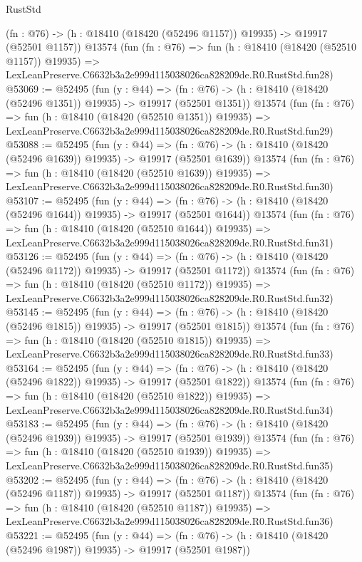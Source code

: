 \begin{lexlean}{RustStd}
\begin{coremodule}
    (fn : @76) -> (h : @18410 (@18420 (@52496 @1157)) @19935) -> @19917 (@52501 @1157))
    @13574
    (fun (fn : @76) =>
    fun (h : @18410 (@18420 (@52510 @1157)) @19935) =>
    LexLeanPreserve.C6632b3a2e999d115038026ca828209de.R0.RustStd.fun28)
@53069 := @52495
    (fun (y : @44) =>
    (fn : @76) -> (h : @18410 (@18420 (@52496 @1351)) @19935) -> @19917 (@52501 @1351))
    @13574
    (fun (fn : @76) =>
    fun (h : @18410 (@18420 (@52510 @1351)) @19935) =>
    LexLeanPreserve.C6632b3a2e999d115038026ca828209de.R0.RustStd.fun29)
@53088 := @52495
    (fun (y : @44) =>
    (fn : @76) -> (h : @18410 (@18420 (@52496 @1639)) @19935) -> @19917 (@52501 @1639))
    @13574
    (fun (fn : @76) =>
    fun (h : @18410 (@18420 (@52510 @1639)) @19935) =>
    LexLeanPreserve.C6632b3a2e999d115038026ca828209de.R0.RustStd.fun30)
@53107 := @52495
    (fun (y : @44) =>
    (fn : @76) -> (h : @18410 (@18420 (@52496 @1644)) @19935) -> @19917 (@52501 @1644))
    @13574
    (fun (fn : @76) =>
    fun (h : @18410 (@18420 (@52510 @1644)) @19935) =>
    LexLeanPreserve.C6632b3a2e999d115038026ca828209de.R0.RustStd.fun31)
@53126 := @52495
    (fun (y : @44) =>
    (fn : @76) -> (h : @18410 (@18420 (@52496 @1172)) @19935) -> @19917 (@52501 @1172))
    @13574
    (fun (fn : @76) =>
    fun (h : @18410 (@18420 (@52510 @1172)) @19935) =>
    LexLeanPreserve.C6632b3a2e999d115038026ca828209de.R0.RustStd.fun32)
@53145 := @52495
    (fun (y : @44) =>
    (fn : @76) -> (h : @18410 (@18420 (@52496 @1815)) @19935) -> @19917 (@52501 @1815))
    @13574
    (fun (fn : @76) =>
    fun (h : @18410 (@18420 (@52510 @1815)) @19935) =>
    LexLeanPreserve.C6632b3a2e999d115038026ca828209de.R0.RustStd.fun33)
@53164 := @52495
    (fun (y : @44) =>
    (fn : @76) -> (h : @18410 (@18420 (@52496 @1822)) @19935) -> @19917 (@52501 @1822))
    @13574
    (fun (fn : @76) =>
    fun (h : @18410 (@18420 (@52510 @1822)) @19935) =>
    LexLeanPreserve.C6632b3a2e999d115038026ca828209de.R0.RustStd.fun34)
@53183 := @52495
    (fun (y : @44) =>
    (fn : @76) -> (h : @18410 (@18420 (@52496 @1939)) @19935) -> @19917 (@52501 @1939))
    @13574
    (fun (fn : @76) =>
    fun (h : @18410 (@18420 (@52510 @1939)) @19935) =>
    LexLeanPreserve.C6632b3a2e999d115038026ca828209de.R0.RustStd.fun35)
@53202 := @52495
    (fun (y : @44) =>
    (fn : @76) -> (h : @18410 (@18420 (@52496 @1187)) @19935) -> @19917 (@52501 @1187))
    @13574
    (fun (fn : @76) =>
    fun (h : @18410 (@18420 (@52510 @1187)) @19935) =>
    LexLeanPreserve.C6632b3a2e999d115038026ca828209de.R0.RustStd.fun36)
@53221 := @52495
    (fun (y : @44) =>
    (fn : @76) -> (h : @18410 (@18420 (@52496 @1987)) @19935) -> @19917 (@52501 @1987))

\end{coremodule}
\end{lexlean}
